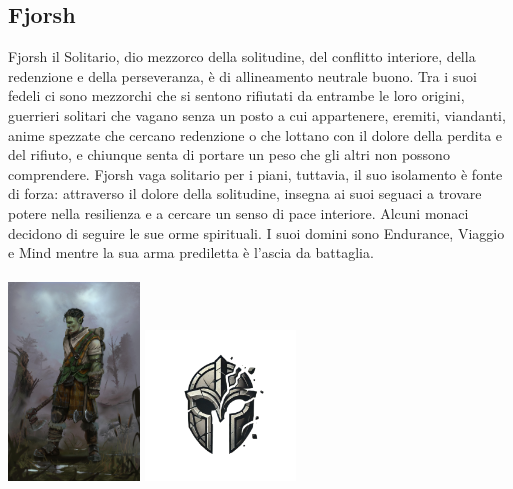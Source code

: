 \documentclass[10pt, a4paper]{report}
\begin{document}
\begin{multicols}{2}
\subsection*{Fjorsh}
Fjorsh il Solitario, dio mezzorco della solitudine, del conflitto interiore, della redenzione e della perseveranza, è di allineamento neutrale buono. Tra i suoi fedeli ci sono mezzorchi che si sentono rifiutati da entrambe le loro origini, guerrieri solitari che vagano senza un posto a cui appartenere, eremiti, viandanti, anime spezzate che cercano redenzione o che lottano con il dolore della perdita e del rifiuto, e chiunque senta di portare un peso che gli altri non possono comprendere. Fjorsh vaga solitario per i piani, tuttavia, il suo isolamento è fonte di forza: attraverso il dolore della solitudine, insegna ai suoi seguaci a trovare potere nella resilienza e a cercare un senso di pace interiore. Alcuni monaci decidono di seguire le sue orme spirituali. I suoi domini sono Endurance, Viaggio e Mind mentre la sua arma prediletta è l'ascia da battaglia.\\
\\
\includegraphics[width = 3.5cm]{fjorsh.jpg}
\includegraphics[width = 4cm]{fjorsh_simbolo.jpeg}\\

\end{multicols}
\end{document}
